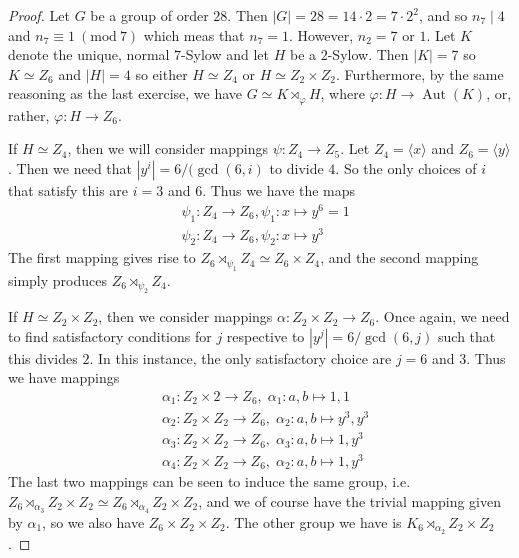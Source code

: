 \documentclass[9pt,reqno]{amsart}
\theoremstyle{definition}
\DeclareMathOperator{\aut}{Aut}
\newcommand{\Mod}[1]{\ (\mathrm{mod}\ #1)}
\begin{document}
\begin{proof}
	Let $G$ be a group of order $28$. Then $|G| = 28 = 14 \cdot 2  = 7 \cdot 2^2$, and so $n_7 \mid 4$ and $n_7 \equiv 1 \Mod{7}$ which meas that $n_7 = 1$. However, $n_2 = 7$ or $1$. Let $K$ denote the unique, normal $7$-Sylow and let $H$ be a $2$-Sylow. Then $|K| = 7$ so $K \simeq Z_6$ and $|H| = 4$ so either $H \simeq Z_4$ or $H \simeq Z_2 \times Z_2$. Furthermore, by the same reasoning as the last exercise, we have $G \simeq K \rtimes_\varphi H$, where $\varphi \colon H \to \aut (K)$, or, rather, $\varphi \colon H \to Z_6$. 
	
	If $H \simeq Z_4$, then we will consider mappings $\psi \colon Z_4 \to Z_5$. Let $Z_4 = \langle x \rangle $ and $Z_6 = \langle y \rangle$. Then we need that $|y^i| = 6/(\gcd(6, i)$ to divide $4$. So the only choices of $i$ that satisfy this are $i = 3$ and $6$. Thus we have the maps 
	\begin{align*}
		&\psi_1 \colon Z_4 \to Z_6, \psi_1 \colon x \mapsto y^6 = 1 \\
		& \psi_2 \colon Z_4 \to Z_6, \psi_2 \colon x \mapsto y^3
	\end{align*}
	The first mapping gives rise to $Z_6 \rtimes_{\psi_1} Z_4 \simeq Z_6 \times Z_4$, and the second mapping simply produces $Z_6 \rtimes_{\psi_2} Z_4$. 
	
	If $H \simeq Z_2 \times Z_2$, then we consider mappings $\alpha \colon Z_2 \times Z_2 \to Z_6$. Once again, we need to find satisfactory conditions for $j$ respective to $|y^j| = 6 / \gcd(6, j)$ such that this divides $2$. In this instance, the only satisfactory choice are $j = 6$ and $3$. Thus we have mappings 
	\begin{align*}
		& \alpha_1 \colon Z_2 \times 2 \to Z_6, \; \alpha_1 \colon a,b  \mapsto 1, 1 \\ 
		& \alpha_2 \colon Z_2 \times Z_2 \to Z_6, \; \alpha_2 \colon a,b \mapsto y^3, y^3 \\ 
		& \alpha_3 \colon Z_2 \times Z_2 \to Z_6, \; \alpha_3  \colon a,b \mapsto 1, y^3 \\
		& \alpha_4 \colon Z_2 \times Z_2 \to Z_6, \; \alpha_2 \colon a,b \mapsto 1, y^3 
	\end{align*}
	The last two mappings can be seen to induce the same group, i.e. $Z_6 \rtimes_{\alpha_3} Z_2 \times Z_2 \simeq Z_6 \rtimes_{\alpha_4} Z_2 \times Z_2$, and we of course have the trivial mapping given by $\alpha_1$, so we also have $Z_6 \times Z_2 \times Z_2$. The other group we have is $K_6 \rtimes_{\alpha_2} Z_2 \times Z_2$. 
\end{proof}
\end{document}
